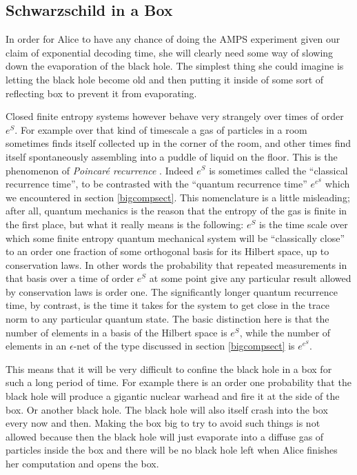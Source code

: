 \documentclass[12pt]{article}
\begin{document}
\subsection{Schwarzschild in a Box}
In order for Alice to have any chance of doing the AMPS experiment given our claim of exponential decoding time, she will clearly need some way of slowing down the evaporation of the black hole.  The simplest thing she could imagine is letting the black hole become old and then putting it inside of some sort of reflecting box to prevent it from evaporating.  

Closed finite entropy systems however behave very strangely over times of order $e^S$.  For example over that kind of timescale a gas of particles in a room sometimes finds itself collected up in the corner of the room, and other times find itself spontaneously assembling into a puddle of liquid on the floor.  This is the phenomenon of \textit{Poincar\'e recurrence} \cite{sussrec}.  Indeed $e^S$ is sometimes called the ``classical recurrence time'', to be contrasted with the ``quantum recurrence time'' $e^{e^S}$ which we encountered in section \ref{bigcompsect}.  This nomenclature is a little misleading; after all, quantum mechanics is the reason that the entropy of the gas is finite in the first place, but what it really means is the following: $e^S$ is the time scale over which some finite entropy quantum mechanical system will be ``classically close'' to an order one fraction of some orthogonal basis for its Hilbert space, up to conservation laws.  In other words the probability that repeated measurements in that basis over a time of order $e^S$ at some point give any particular result allowed by conservation laws is order one.  The significantly longer quantum recurrence time, by contrast, is the time it takes for the system to get close in the trace norm to any particular quantum state.  The basic distinction here is that the number of elements in a basis of the Hilbert space is $e^S$, while the number of elements in an $\epsilon$-net of the type discussed in section \ref{bigcompsect} is $e^{e^S}$.  

This means that it will be very difficult to confine the black hole in a box for such a long period of time.  For example there is an order one probability that the black hole will produce a gigantic nuclear warhead and fire it at the side of the box.  Or another black hole.  The black hole will also itself crash into the box every now and then.  Making the box big to try to avoid such things is not allowed because then the black hole will just evaporate into a diffuse gas of particles inside the box and there will be no black hole left when Alice finishes her computation and opens the box.  
\end{document}
